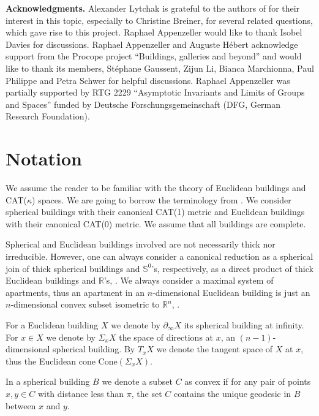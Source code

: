 \documentclass[12pt,leqno]{amsart}
\numberwithin{equation}{section}
\theoremstyle{definition}
\theoremstyle{remark}
\newcommand{\R}{\mathbb{R}}
\begin{document}
  



{\bf Acknowledgments.} Alexander Lytchak is grateful to the authors of \cite{BM} for their interest in this topic, especially  to Christine Breiner, for several related questions, which gave rise to this project.    Raphael Appenzeller would like to thank Isobel Davies for discussions. Raphael Appenzeller and Auguste H\'ebert acknowledge support from the Procope project
``Buildings, galleries and beyond'' and would like to thank its members, St\'ephane Gaussent, Zijun Li, Bianca Marchionna, Paul Philippe and Petra Schwer for helpful discussions. 
Raphael Appenzeller was partially supported by RTG 2229 ``Asymptotic Invariants and Limits of Groups and Spaces'' funded by Deutsche Forschungsgemeinschaft (DFG, German Research Foundation).




\section{Notation}
\label{subsec-notations}
We assume the reader to be familiar with the theory of Euclidean buildings and  CAT($\kappa$) spaces.
We are going to borrow the terminology  from  \cite{KleinerLeeb1}.   We consider spherical buildings with their canonical CAT(1) metric and Euclidean buildings with their canonical CAT(0) metric.  We assume that all buildings are complete.

Spherical and Euclidean  buildings involved are not necessarily thick nor irreducible. However, one can always consider a canonical reduction  as a spherical join of thick spherical buildings and $\mathbb S^0$'s, respectively, as a direct product of thick Euclidean buildings and $\R$'s, \cite[Sections 3.7, 4.9]{KleinerLeeb1}.  We always consider a maximal system of apartments, thus an apartment in an $n$-dimensional Euclidean  building is just an $n$-dimensional convex subset isometric to $\R^n$, \cite[Corollary 4.6.2]{KleinerLeeb1}.




For a Euclidean building $X$ we denote by $\partial _{\infty } X$ its spherical building at infinity.  For $x\in X$ we denote by $\Sigma _x X$ the space of directions at $x$, an $(n-1)$-dimensional spherical building. By $T_xX$ we denote the tangent space of $X$ at $x$, thus the Euclidean cone 
$\text{Cone}(\Sigma _x X)$.


In a spherical building  $B$ we denote a subset $C$ as convex if for any pair of points $x,y\in C$ with distance less than $\pi$, the set $C$ contains the unique geodesic in $B$ between $x$ and $y$. 
\end{document}
